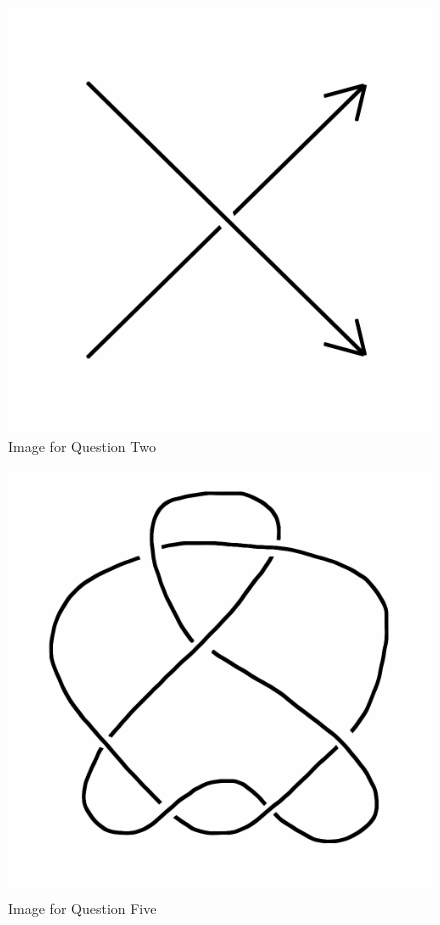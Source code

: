 \documentclass[12pt,letterpaper]{article}
\theoremstyle{definition}
\begin{document}
\setlength{\parskip}{1ex plus 0.5ex minus 0.2ex}
\setlength{\parindent}{0pt}

\pagestyle{fancy}
\cfoot{}


\begin{figure}[h]
    \centering
    \includegraphics[width=.5\textwidth]{knotpics/poscross.png}
    \caption{Image for Question Two}
\end{figure}


\begin{figure}[h!]
    \centering
    \includegraphics[width=.5\textwidth]{knotpics/7-2-1.png}
    \caption{Image for Question Five}
\end{figure}
\end{document}
